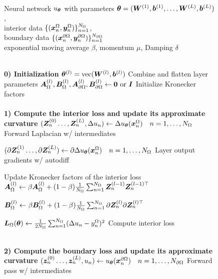 \begin{figure}
  \centering
\begin{algorithmic}
  \Require \\
  Neural network $u_{{\bm{\theta}}}$ with parameters ${\bm{\theta}} = ({\bm{W}}^{(1)}, {\bm{b}}^{(1)}, \dots, {\bm{W}}^{(L)}, {\bm{b}}^{(L)}) $, \\
  interior data $\{({\bm{x}}^{\Omega}_n, {\bm{y}}^{\Omega}_n) \}_{n=1}^{N_{\Omega}}$, \\
  boundary data $\{({\bm{x}}^{\partial\Omega}_n, {\bm{y}}^{\partial\Omega}_n) \}_{n=1}^{N_{\partial\Omega}}$ \\
  exponential moving average $\beta$, momentum $\mu$, Damping $\delta$

  \\
  \State \textbf{0) Initialization}
  \State ${\bm{\theta}}^{(l)} = \mathrm{vec}( {\bm{W}}^{(l)}, {\bm{b}}^{(l)})$ \Comment Combine and flatten layer parameters
  \State ${\bm{A}}_{\Omega}^{(l)}, {\bm{B}}_{\Omega}^{(l)}, {\bm{A}}_{\partial\Omega}^{(l)}, {\bm{B}}_{\partial\Omega}^{(l)} \gets {\bm{0}} \text{ or } {\bm{I}}$ \Comment Initialize Kronecker factors
  \EndFor
  \\
  \\
  \State \textbf{1) Compute the interior loss and update its approximate curvature}
  \State $({\bm{Z}}_n^{(0)}\dots, {\bm{Z}}_n^{(L)}, \Delta u_n) \gets \Delta u_{{\bm{\theta}}}({\bm{x}}_n^{\Omega})\quad n=1, \dots, N_{\Omega}$  \Comment Forward Laplacian w/ intermediates

  \State $(\partial{\bm{Z}}_n^{(1)}\dots, \partial{\bm{Z}}_n^{(L)}) \gets \partial \Delta u_{{\bm{\theta}}}({\bm{x}}_n^{\Omega})\quad n=1, \dots, N_{\Omega}$ \Comment Layer output gradients w/ autodiff

   \Comment Update Kronecker factors of the interior loss
  \State ${\bm{A}}_{\Omega}^{(l)} \gets \beta {\bm{A}}_{\Omega}^{(l)} + (1-\beta) \frac1{N_{\Omega}} \sum_{n=1}^{N_{\Omega}} {\bm{Z}}_n^{(l-1)} {\bm{Z}}_n^{(l-1)\top}$

  \State ${\bm{B}}_{\Omega}^{(l)} \gets \beta {\bm{B}}_{\Omega}^{(l)} + (1-\beta) \frac1{N_{\Omega}} \sum_{n=1}^{N_{\Omega}} \partial{\bm{Z}}_n^{(l)} \partial{\bm{Z}}_n^{(l)\top}$
  \EndFor

  \State ${\bm{L}}_{\Omega}({\bm{\theta}}) \gets \frac{1}{2 N_{\Omega}}\sum_{n=1}^{N_{\Omega}} (\Delta u_n - y_n^{\Omega})^2$ \Comment Compute interior loss

  \\
  \State \textbf{2) Compute the boundary loss and update its approximate curvature}
  \State $({\bm{z}}_n^{(0)}\dots, {\bm{z}}_n^{(L)}, u_n) \gets u_{{\bm{\theta}}}({\bm{x}}_n^{\partial\Omega})\quad n=1, \dots, N_{\partial\Omega}$ \Comment Forward pass w/ intermediates


\end{algorithmic}
\end{figure}
